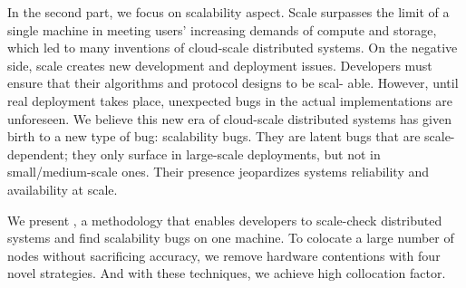 In the second part, we focus on scalability aspect. Scale surpasses the limit of
a single machine in meeting users' increasing demands of compute and storage,
which led to many inventions of cloud-scale distributed systems.  On the
negative side, scale creates new development and deployment issues. Developers
must ensure that their algorithms and protocol designs to be scal- able.
However, until real deployment takes place, unexpected bugs in the actual
implementations are unforeseen. We believe this new era of cloud-scale
distributed systems has given birth to a new type of bug: scalability bugs. They
are latent bugs that are scale-dependent; they only surface in large-scale
deployments, but not in small/medium-scale ones. Their presence jeopardizes
systems reliability and availability at scale.

We present \sck, a methodology that enables developers to scale-check
distributed systems and find scalability bugs on one machine. To colocate a
large number of nodes without sacrificing accuracy, we remove hardware
contentions with four novel strategies. And with these techniques, we achieve
high collocation factor.
